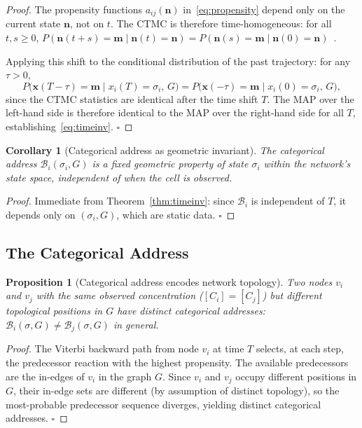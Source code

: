 \documentclass[twocolumn,10pt,a4paper]{article}
\newcommand{\Back}{\mathcal{B}}
\newtheorem{proposition}[theorem]{Proposition}
\newtheorem{corollary}[theorem]{Corollary}
\begin{document}
\begin{proof}
The propensity functions $a_{ij}(\mathbf{n})$ in~\eqref{eq:propensity} depend
only on the current state $\mathbf{n}$, not on $t$.  The CTMC is therefore
time-homogeneous: for all $t,s\geq 0$,
$P(\mathbf{n}(t+s)=\mathbf{m}\mid\mathbf{n}(t)=\mathbf{n})=
P(\mathbf{n}(s)=\mathbf{m}\mid\mathbf{n}(0)=\mathbf{n})$~\cite{vanKampen2007}.

Applying this shift to the conditional distribution of the past trajectory:
for any $\tau>0$,
\[
  P\bigl(\mathbf{x}(T-\tau)=\mathbf{m}\mid x_i(T)=\sigma_i,\,G\bigr)
  = P\bigl(\mathbf{x}(-\tau)=\mathbf{m}\mid x_i(0)=\sigma_i,\,G\bigr),
\]
since the CTMC statistics are identical after the time shift $T$.  The MAP
over the left-hand side is therefore identical to the MAP over the right-hand
side for all $T$, establishing~\eqref{eq:timeinv}.  $\square$
\end{proof}

\begin{corollary}[Categorical address as geometric invariant]
\label{cor:geom-inv}
The categorical address $\Back_i(\sigma_i,G)$ is a fixed geometric property
of state $\sigma_i$ within the network's state space, independent of when the
cell is observed.
\end{corollary}

\begin{proof}
Immediate from Theorem~\ref{thm:timeinv}: since $\Back_i$ is independent of
$T$, it depends only on $(\sigma_i,G)$, which are static data.  $\square$
\end{proof}

\subsection{The Categorical Address}
\label{sec:backward-address}

\begin{proposition}[Categorical address encodes network topology]
\label{prop:cat-addr-topo}
Two nodes $v_i$ and $v_j$ with the same observed concentration
($[C_i]=[C_j]$) but different topological positions in $G$ have distinct
categorical addresses: $\Back_i(\sigma,G)\neq\Back_j(\sigma,G)$ in general.
\end{proposition}

\begin{proof}
The Viterbi backward path from node $v_i$ at time $T$ selects, at each step,
the predecessor reaction with the highest propensity.  The available
predecessors are the in-edges of $v_i$ in the graph $G$.  Since $v_i$ and
$v_j$ occupy different positions in $G$, their in-edge sets are different
(by assumption of distinct topology), so the most-probable predecessor
sequence diverges, yielding distinct categorical addresses.  $\square$
\end{proof}
\end{document}
